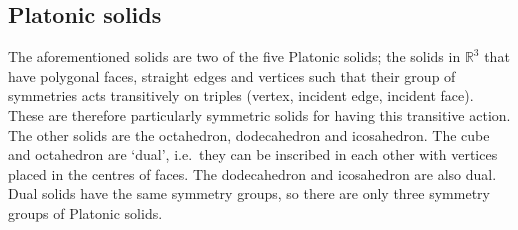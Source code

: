 \subsection{Platonic solids}
The aforementioned solids are two of the five Platonic solids; the solids in \(\mathbb R^3\) that have polygonal faces, straight edges and vertices such that their group of symmetries acts transitively on triples (vertex, incident edge, incident face).
These are therefore particularly symmetric solids for having this transitive action.
The other solids are the octahedron, dodecahedron and icosahedron.
The cube and octahedron are `dual', i.e.\ they can be inscribed in each other with vertices placed in the centres of faces.
The dodecahedron and icosahedron are also dual.
Dual solids have the same symmetry groups, so there are only three symmetry groups of Platonic solids.

